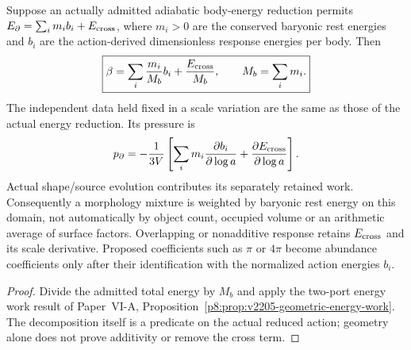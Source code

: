 \documentclass[12pt,a4paper]{article}
\begin{document}
\begin{proposition}
\label{p9:prop:v2205-mass-weighted-shape-mixture}
Suppose an actually admitted adiabatic body-energy reduction permits
$E_\partial=\sum_i m_i b_i+E_{\rm cross}$, where $m_i>0$ are the
conserved baryonic rest energies and $b_i$ are the action-derived
dimensionless response energies per body. Then
\begin{equation}
\label{p9:eq:v2205-mass-weighted-shape-mixture}
 \boxed{\beta=\sum_i\frac{m_i}{M_b}b_i+
                \frac{E_{\rm cross}}{M_b},\qquad M_b=\sum_i m_i.}
\end{equation}
The independent data held fixed in a scale variation are the same as
those of the actual energy reduction. Its pressure is
\[
 p_\partial=-\frac1{3V}
 \left[\sum_i m_i\frac{\partial b_i}{\partial\log a}
                  +\frac{\partial E_{\rm cross}}{\partial\log a}\right].
\]
Actual shape/source evolution contributes its separately retained work.
Consequently a morphology mixture is weighted by baryonic rest energy
on this domain, not automatically by object count, occupied volume or
an arithmetic average of surface factors. Overlapping or nonadditive
response retains $E_{\rm cross}$ and its scale derivative. Proposed
coefficients such as $\pi$ or $4\pi$ become abundance coefficients only
after their identification with the normalized action energies $b_i$.
\end{proposition}
\begin{proof}
Divide the admitted total energy by $M_b$ and apply the two-port energy
work result of Paper~VI-A,
Proposition~\ref{p8:prop:v2205-geometric-energy-work}.
The decomposition itself is a predicate on the actual reduced action;
geometry alone does not prove additivity or remove the cross term.
\end{proof}
\end{document}
